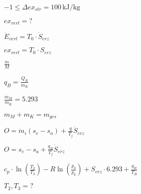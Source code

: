 \( -1 \leq \Delta ex_{str} = 100 \, \text{kJ/kg} \)  

\( ex_{verl} = ? \)  

\( \dot{E}_{verl} = T_0 \cdot \dot{S}_{erz} \)  

\( ex_{verl} = T_0 \cdot S_{erz} \)  

\( \frac{m}{M} \)  

\( q_B = \frac{\dot{Q}_B}{\dot{m}_K} \)  

\( \frac{\dot{m}_M}{\dot{m}_K} = 5.293 \)  

\( m_M + m_K = m_{ges} \)  

\( O = \dot{m}_{i} (s_{e} - s_{a}) + \frac{q}{T_j} \dot{S}_{erz} \)  

\( O = s_{e} - s_{a} + \frac{q_B}{T_j} \dot{S}_{erz} \)  

\( c_p \cdot \ln (\frac{T_2}{T_3}) - R \ln (\frac{p_0}{p_6}) + S_{erz} \cdot 6.293 + \frac{q_B}{T_B} \)  

\( T_2, T_3 = ? \)